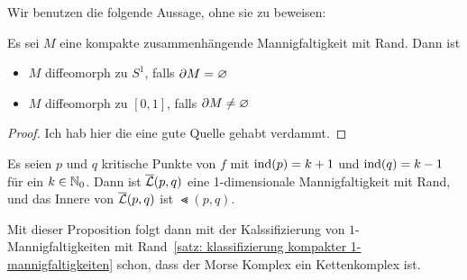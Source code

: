 Wir benutzen die folgende Aussage, ohne sie zu beweisen:

\begin{theorem}
    \label{satz: klassifizierung kompakter 1-mannigfaltigkeiten}
    Es sei $M$ eine kompakte zusammenhängende Mannigfaltigkeit mit Rand. Dann ist
    \begin{itemize}
        \item $M$ diffeomorph zu $S^1$, falls ${ \partial } M = \varnothing$
        \item $M$ diffeomorph zu $[0, 1]$, falls ${ \partial } M \neq \varnothing$
    \end{itemize}
\end{theorem}

\begin{proof}
    Ich hab hier die eine gute Quelle gehabt verdammt. 
\end{proof}

\begin{theorem}
    \label{satz: gebrochene trajektorien sind 1-dim mannigfaltigkeit}
    Es seien $p$ und $q$ kritische Punkte von $f$ mit ${ \operatorname{ind} } (p) = k + 1$ und ${ \operatorname{ind} } (q) = k - 1$
    für ein $k \in { \mathbb N }_0$. Dann ist ${\overline{\mathcal{L}} } (p, q)$ eine 1-dimensionale Mannigfaltigkeit mit Rand, und das
    Innere von ${\overline{\mathcal{L}} } (p, q)$ ist $\Lt (p, q)$.
\end{theorem}

Mit dieser Proposition folgt dann mit der Kalssifizierung von $1$-Mannigfaltigkeiten mit 
Rand~\ref{satz: klassifizierung kompakter 1-mannigfaltigkeiten} schon, dass der Morse Komplex ein
Kettenkomplex ist.

